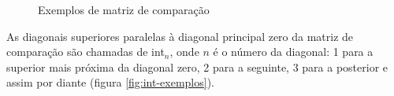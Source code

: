 \begin{figure}
  \centering
  \qquad
  \qquad
  \caption{Exemplos de matriz de comparação}
  \label{fig:matriz-exemplos}
\end{figure}

As diagonais superiores paralelas à diagonal principal zero da matriz
de comparação são chamadas de int$_n$, onde $n$ é o número da
diagonal: 1 para a superior mais próxima da diagonal zero, 2 para a
seguinte, 3 para a posterior e assim por diante (figura
\ref{fig:int-exemplos}).


